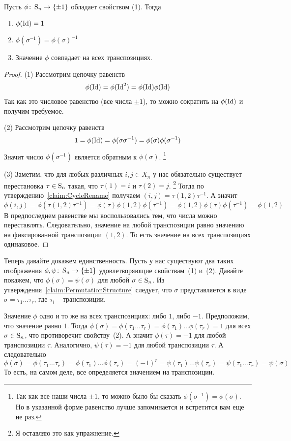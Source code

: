 \begin{claim}
\label{claim::PermSignUnique}
Пусть $\phi\colon \operatorname{S}_{n}\to \{\pm1\}$ обладает свойством (1).
Тогда
\begin{enumerate}
\item $\phi(\operatorname{Id}) = 1$

\item $\phi(\sigma^{-1}) = \phi(\sigma)^{-1}$

\item Значение $\phi$ совпадает на всех транспозициях.
\end{enumerate}
\end{claim}
\begin{proof}
(1) Рассмотрим цепочку равенств
\[
\phi(\operatorname{Id}) = \phi(\operatorname{Id}^2) = \phi(\operatorname{Id})\phi(\operatorname{Id})
\]
Так как это числовое равенство (все числа $\pm 1$), то можно сократить на $\phi(\operatorname{Id})$ и получим требуемое.

(2) Рассмотрим цепочку равенств
\[
1 = \phi(\operatorname{Id}) = \phi(\sigma \sigma^{-1}) = \phi(\sigma)\phi(\sigma^{-1})
\]
Значит число $\phi(\sigma^{-1})$ является обратным к $\phi(\sigma)$.%
\footnote{Так как все наши числа $\pm 1$, то можно было бы сказать $\phi(\sigma^{-1}) = \phi(\sigma)$.
Но в указанной форме равенство лучше запоминается и встретится вам еще не раз.}

(3) Заметим, что для любых различных $i, j\in X_n$ у нас обязательно существует перестановка $\tau\in\operatorname{S}_{n}$ такая, что $\tau(1) = i$ и $\tau(2) = j$.%
\footnote{Я оставляю это как упражнение.}
Тогда по утверждению~\ref{claim:CycleRename} получаем $(i,j) = \tau (1,2)\tau^{-1}$.
А значит
\[
\phi(i,j) = \phi(\tau (1,2) \tau^{-1}) = \phi(\tau)\phi(1,2)\phi(\tau^{-1}) = \phi(1,2)\phi(\tau)\phi(\tau^{-1}) = \phi(1,2)
\]
В предпоследнем равенстве мы воспользовались тем, что числа можно переставлять.
Следовательно, значение на любой транспозиции равно значению на фиксированной транспозиции $(1,2)$.
То есть значение на всех транспозициях одинаковое.
\end{proof}

Теперь давайте докажем единственность.
Пусть у нас существуют два таких отображения $\phi, \psi\colon \operatorname{S}_{n}\to \{\pm 1\}$ удовлетворяющие свойствам~(1) и~(2).
Давайте покажем, что $\phi(\sigma) = \psi(\sigma)$ для любой $\sigma\in\operatorname{S}_{n}$.
Из утверждения~\ref{claim:PermutationStructure}  следует, что $\sigma$ представляется в виде $\sigma = \tau_1\ldots\tau_r$, где $\tau_i$ -- транспозиции.

Значение $\phi$ одно и то же на всех транспозициях: либо $1$, либо $-1$.
Предположим, что значение равно $1$.
Тогда $\phi(\sigma) = \phi(\tau_1\ldots\tau_r) = \phi(\tau_1)\ldots\phi(\tau_r) = 1$ для всех $\sigma\in\operatorname{S}_{n}$, что противоречит свойству~(2).
А значит $\phi(\tau) = -1$ для любой транспозиции $\tau$.
Аналогично, $\psi(\tau) = -1$ для любой транспозиции $\tau$.
А следовательно
\[
\phi(\sigma) = \phi(\tau_1\ldots\tau_r) = \phi(\tau_1)\ldots\phi(\tau_r) = (-1)^r =\psi(\tau_1)\ldots\psi(\tau_r) = \psi(\tau_1\ldots\tau_r)=\psi(\sigma)
\]
То есть, на самом деле, все определяется значением на транспозиции.
